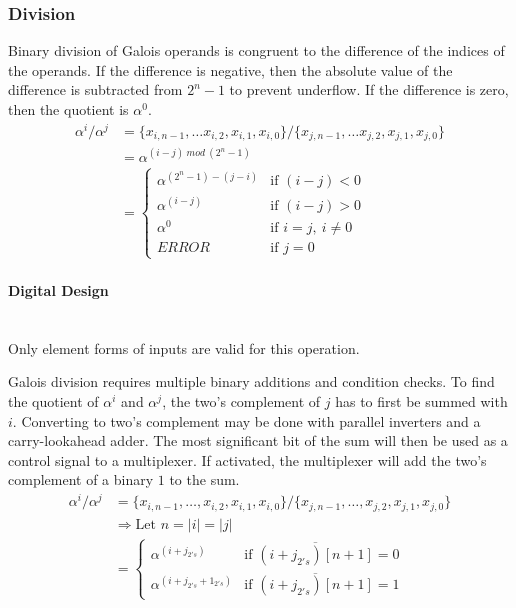 \subsubsection{Division} Binary division of Galois operands is congruent to the
difference of the indices of the operands. If the difference is negative, then
the absolute value of the difference is subtracted from $2^{n}-1$ to prevent
underflow. If the difference is zero, then the quotient is $\alpha^{0}$.
    \begin{align*}
        \alpha^{i} / \alpha^{j} & = \{x_{i, n-1},\ldots x_{i, 2},x_{i,
        1},x_{i, 0}\} / \{x_{j, n-1}, \ldots x_{j, 2}, x_{j, 1}, x_{j, 0}\}
        \\
        & = \alpha^{(i - j) \ mod \ (2^{n}-1)} \\
        & = \begin{cases}
            \alpha^{(2^{n}-1) - (j - i)} & \text{if $(i - j) < 0$} \\
            \alpha^{(i - j)} & \text{if $(i - j) > 0$} \\
            \alpha^{0} & \text{if $i = j, \ i \neq 0$} \\
            ERROR & \text{if $j = 0$}
        \end{cases}
    \end{align*}

    \paragraph{{\small Digital Design}} \leavevmode \\ Only element forms of
    inputs are valid for this operation.

    Galois division requires multiple binary additions and condition checks. To
    find the quotient of $\alpha^{i}$ and $\alpha^{j}$, the two's complement of
    $j$ has to first be summed with $i$. Converting to two's complement may be
    done with parallel inverters and a carry-lookahead adder. The most
    significant bit of the sum will then be used as a control signal to a
    multiplexer. If activated, the multiplexer will add the two's complement of
    a binary $1$ to the sum.
\begin{align*}
    \alpha^{i} / \alpha^{j} & = \{ x_{i, n-1}, \ldots, x_{i, 2}, x_{i, 1},
    x_{i, 0} \} / \{x_{j, n-1}, \ldots, x_{j, 2}, x_{j, 1}, x_{j, 0}\} \\
    & \Longrightarrow \text{Let } n = |i| = |j| \\
    & = \begin{cases}
            \alpha^{(i + j_{2's})} & \text{if $\overline{(i+j_{2's})[n+1]}=0$} \\
            \alpha^{(i + j_{2's} + 1_{2's})} & \text{if
            $\overline{(i+j_{2's})[n+1]}=1$}
        \end{cases}
\end{align*}
